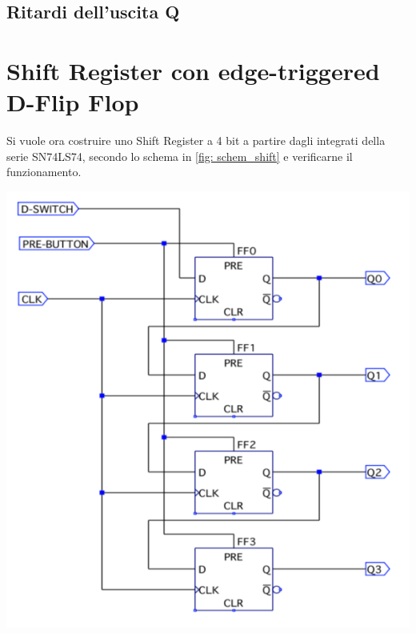 \documentclass[10pt, a4paper, italian]{article}
\begin{document}
\subsection{Ritardi dell'uscita Q}


\section{Shift Register con edge-triggered D-Flip Flop}
\begin{minipage}{0.6\textwidth}
Si vuole ora costruire uno Shift Register a 4 bit a partire dagli integrati della serie SN74LS74, secondo lo schema in \cref{fig: schem_shift} e verificarne il funzionamento.
\end{minipage}
\begin{minipage}{0.4\textwidth}
	\includegraphics[width=\textwidth]{schem_shift}
\end{minipage}
\end{document}
